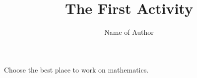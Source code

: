 \documentclass{ximera}
\title{The First Activity}
\author{Name of Author}
\begin{document}
\maketitle
\begin{exercise}
      
  Choose the best place to work on mathematics.
      
  \begin{multipleChoice}
      
      
      
      
  \end{multipleChoice}
      
\end{exercise}
\end{document}
